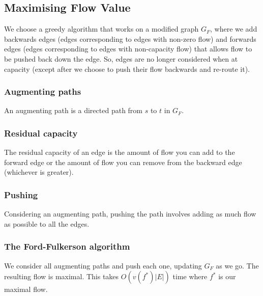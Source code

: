 \documentclass[a4paper, 12pt, twoside]{article}
\begin{document}
\subsection{Maximising Flow Value}

We choose a greedy algorithm that works on a modified graph $G_F$, where we add backwards edges
(edges corresponding to edges with non-zero flow) 
and forwards edges 
(edges corresponding to edges with non-capacity flow) 
that allows flow to be pushed back down the edge. So, edges are no longer considered when 
at capacity (except after we choose to push their flow backwards and re-route it).

\subsubsection{Augmenting paths}

An augmenting path is a directed path from $s$ to $t$ in $G_F$.

\subsubsection{Residual capacity}

The residual capacity of an edge is the amount of flow you can add to the forward edge or
the amount of flow you can remove from the backward edge (whichever is greater).

\subsubsection{Pushing}

Considering an augmenting path, pushing the path involves adding as much flow as possible to
all the edges.

\subsubsection{The Ford-Fulkerson algorithm}

We consider all augmenting paths and push each one, updating $G_F$ as we go. 
The resulting flow is maximal. This takes $O(v(f^*)|E|)$ time where $f^*$ is our maximal flow.
\end{document}
